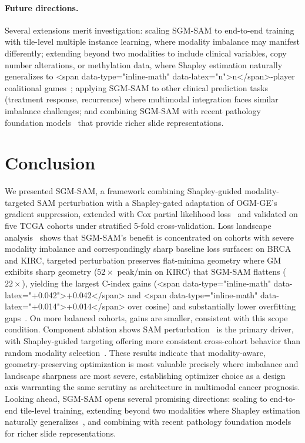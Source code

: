 \documentclass[10pt]{article}\usepackage[utf8]{inputenc}\usepackage[T1]{fontenc}\usepackage{amsmath,amssymb,amsfonts,bm}\usepackage{booktabs}\usepackage{multirow}\usepackage{array}\usepackage{graphicx}\usepackage{algorithm}\usepackage{algorithmic}\usepackage{xcolor}\usepackage[margin=1in]{geometry}\usepackage{microtype}
\begin{document}
\paragraph{Future directions.} Several extensions merit investigation: scaling SGM-SAM to end-to-end training with tile-level multiple instance learning, where modality imbalance may manifest differently; extending beyond two modalities to include clinical variables, copy number alterations, or methylation data, where Shapley estimation naturally generalizes to <span data-type="inline-math" data-latex="n">n</span>-player coalitional games~\cite{shapley1953}; applying SGM-SAM to other clinical prediction tasks (treatment response, recurrence) where multimodal integration faces similar imbalance challenges; and combining SGM-SAM with recent pathology foundation models~\cite{vorontsov2024uni,lu2024path,chen2024path} that provide richer slide representations.

\section{Conclusion}\label{sec:conclusion}
We presented SGM-SAM, a framework combining Shapley-guided modality-targeted SAM perturbation with a Shapley-gated adaptation of OGM-GE's gradient suppression, extended with Cox partial likelihood loss~\cite{cox1972,katzman2018deepsurv} and validated on five TCGA cohorts under stratified 5-fold cross-validation. Loss landscape analysis~\cite{li2018visualizing} shows that SGM-SAM's benefit is concentrated on cohorts with severe modality imbalance and correspondingly sharp baseline loss surfaces: on BRCA and KIRC, targeted perturbation preserves flat-minima geometry where GM exhibits sharp geometry ($52\times$ peak/min on KIRC) that SGM-SAM flattens ($22\times$), yielding the largest C-index gains (<span data-type="inline-math" data-latex="+0.042">+0.042</span> and <span data-type="inline-math" data-latex="+0.014">+0.014</span> over cosine) and substantially lower overfitting gaps~\cite{hochreiter1997flat,keskar2017largebatch,jiang2020fantastic,andriushchenko2023modern}. On more balanced cohorts, gains are smaller, consistent with this scope condition. Component ablation shows SAM perturbation~\cite{foret2021sam} is the primary driver, with Shapley-guided targeting offering more consistent cross-cohort behavior than random modality selection~\cite{rajoli2025msam}. These results indicate that modality-aware, geometry-preserving optimization is most valuable precisely where imbalance and landscape sharpness are most severe, establishing optimizer choice as a design axis warranting the same scrutiny as architecture in multimodal cancer prognosis. Looking ahead, SGM-SAM opens several promising directions: scaling to end-to-end tile-level training, extending beyond two modalities where Shapley estimation naturally generalizes~\cite{shapley1953}, and combining with recent pathology foundation models~\cite{vorontsov2024uni,lu2024path,chen2024path} for richer slide representations.
\end{document}
